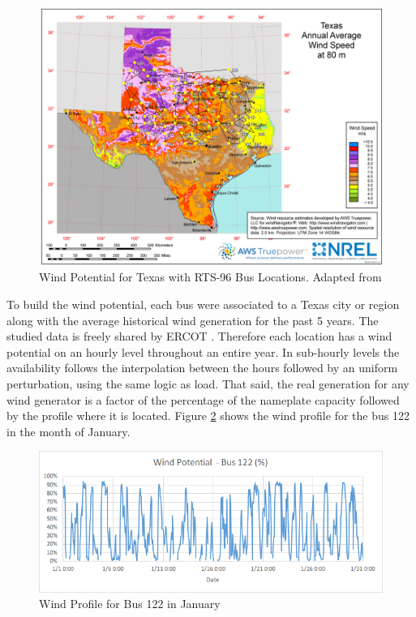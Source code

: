 \documentclass[12pt,LUDisStyle,twosided]{book}
\begin{document}
\begin{figure}[h!] 
  \includegraphics[width=\textwidth,keepaspectratio]{texasWindProfileWithBuses.png}
  \caption{Wind Potential for Texas with RTS-96 Bus Locations. Adapted from \cite{texasWindProfile} }
  \label{fig:texasWindProfile}
\end{figure}


To build the wind potential, each bus were associated to a Texas city or region along with the average historical wind generation for the past 5 years. The studied data is freely shared by ERCOT \cite{ercotGenerationWind}. Therefore each location has a wind potential on an hourly level throughout an entire year. In sub-hourly levels the availability follows the interpolation between the hours followed by an uniform perturbation, using the same logic as load. That said, the real generation for any wind generator is a factor of the percentage of the nameplate capacity followed by the profile where it is located. Figure \ref{fig:windProfileBus122January} shows the wind profile for the bus 122 in the month of January.

\begin{figure}[h!] 
  \includegraphics[width=\textwidth,keepaspectratio]{windPotentialBus122.png}
  \caption{Wind Profile for Bus 122 in January}
  \label{fig:windProfileBus122January}
\end{figure}
\end{document}
